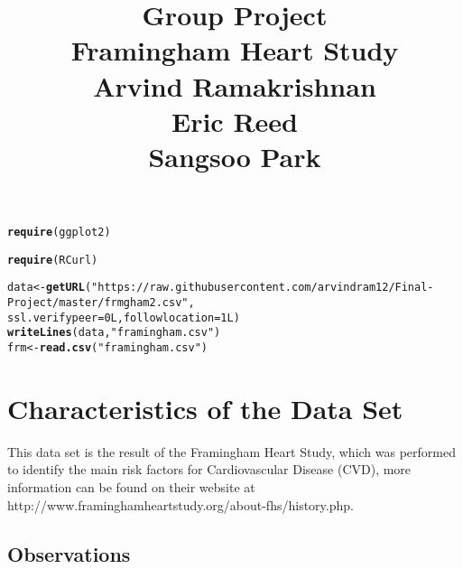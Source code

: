 \documentclass{article}\usepackage[]{graphicx}\usepackage[]{color}
\makeatletter
\newcommand{\hlnum}[1]{\textcolor[rgb]{0.686,0.059,0.569}{#1}}%
\newcommand{\hlstr}[1]{\textcolor[rgb]{0.192,0.494,0.8}{#1}}%
\newcommand{\hlstd}[1]{\textcolor[rgb]{0.345,0.345,0.345}{#1}}%
\newcommand{\hlkwb}[1]{\textcolor[rgb]{0.69,0.353,0.396}{#1}}%
\newcommand{\hlkwc}[1]{\textcolor[rgb]{0.333,0.667,0.333}{#1}}%
\newcommand{\hlkwd}[1]{\textcolor[rgb]{0.737,0.353,0.396}{\textbf{#1}}}%
\newenvironment{kframe}{%
 \def\at@end@of@kframe{}%
 \ifinner\ifhmode%
  \def\at@end@of@kframe{\end{minipage}}%
  \begin{minipage}{\columnwidth}%
 \fi\fi%
 \def\FrameCommand##1{\hskip\@totalleftmargin \hskip-\fboxsep
 \colorbox{shadecolor}{##1}\hskip-\fboxsep
     \hskip-\linewidth \hskip-\@totalleftmargin \hskip\columnwidth}%
 \MakeFramed {\advance\hsize-\width
   \@totalleftmargin\z@ \linewidth\hsize
   \@setminipage}}%
 {\par\unskip\endMakeFramed%
 \at@end@of@kframe}
\newenvironment{knitrout}{}{} %
\makeatother
\begin{document}
\title{Group Project \\ Framingham Heart Study\\ Arvind Ramakrishnan \\ Eric Reed \\ Sangsoo Park}
\author{}
\maketitle
{}
\begin{knitrout}
\color{fgcolor}\begin{kframe}
\begin{alltt}
\hlkwd{require}\hlstd{(ggplot2)}
\end{alltt}


{\ttfamily\noindent\itshape\color{messagecolor}{\#\# Loading required package: ggplot2}}\begin{alltt}
\hlkwd{require}\hlstd{(RCurl)}
\end{alltt}


{\ttfamily\noindent\itshape\color{messagecolor}{\#\# Loading required package: RCurl\\\#\# Loading required package: bitops}}\begin{alltt}
\hlstd{data} \hlkwb{<-} \hlkwd{getURL}\hlstd{(}\hlstr{"https://raw.githubusercontent.com/arvindram12/Final-Project/master/frmgham2.csv"}\hlstd{,}
    \hlkwc{ssl.verifypeer} \hlstd{=} \hlnum{0L}\hlstd{,} \hlkwc{followlocation} \hlstd{=} \hlnum{1L}\hlstd{)}
\hlkwd{writeLines}\hlstd{(data,} \hlstr{"framingham.csv"}\hlstd{)}
\hlstd{frm} \hlkwb{<-} \hlkwd{read.csv}\hlstd{(}\hlstr{"framingham.csv"}\hlstd{)}
\end{alltt}
\end{kframe}
\end{knitrout}



\section{Characteristics of the Data Set}

  This data set is the result of the Framingham Heart Study, which was performed to identify the main risk factors for Cardiovascular Disease (CVD), more information can be found on their website at http://www.framinghamheartstudy.org/about-fhs/history.php.

\subsection{Observations}
\end{document}
